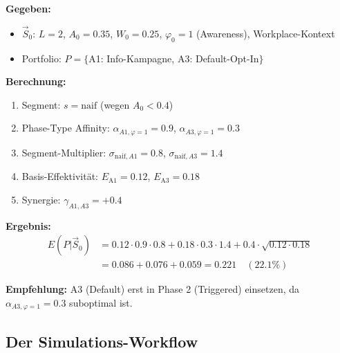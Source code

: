 \begin{tcolorbox}[colback=yellow!5!white, colframe=yellow!75!black,
    title=\textbf{Worked Example: Von $\vec{S}_0$ zu $P(\text{BC})$}]

\textbf{Gegeben:}
\begin{itemize}[nosep]
\item $\vec{S}_0$: $L=2$, $A_0=0.35$, $W_0=0.25$, $\varphi_0=1$ (Awareness), Workplace-Kontext
\item Portfolio: $P = \{$A1: Info-Kampagne, A3: Default-Opt-In$\}$
\end{itemize}

\textbf{Berechnung:}
\begin{enumerate}[nosep]
\item Segment: $s = \text{naif}$ (wegen $A_0 < 0.4$)
\item Phase-Type Affinity: $\alpha_{A1, \varphi=1} = 0.9$, $\alpha_{A3, \varphi=1} = 0.3$
\item Segment-Multiplier: $\sigma_{\text{naif}, A1} = 0.8$, $\sigma_{\text{naif}, A3} = 1.4$
\item Basis-Effektivität: $E_{\text{A1}} = 0.12$, $E_{\text{A3}} = 0.18$
\item Synergie: $\gamma_{A1,A3} = +0.4$
\end{enumerate}

\textbf{Ergebnis:}
\begin{align}
E(P | \vec{S}_0) &= 0.12 \cdot 0.9 \cdot 0.8 + 0.18 \cdot 0.3 \cdot 1.4 + 0.4 \cdot \sqrt{0.12 \cdot 0.18} \nonumber \\
&= 0.086 + 0.076 + 0.059 = 0.221 \quad (22.1\%)
\end{align}

\textbf{Empfehlung:} A3 (Default) erst in Phase 2 (Triggered) einsetzen, da $\alpha_{A3, \varphi=1} = 0.3$ suboptimal ist.
\end{tcolorbox}

\subsection{Der Simulations-Workflow}

